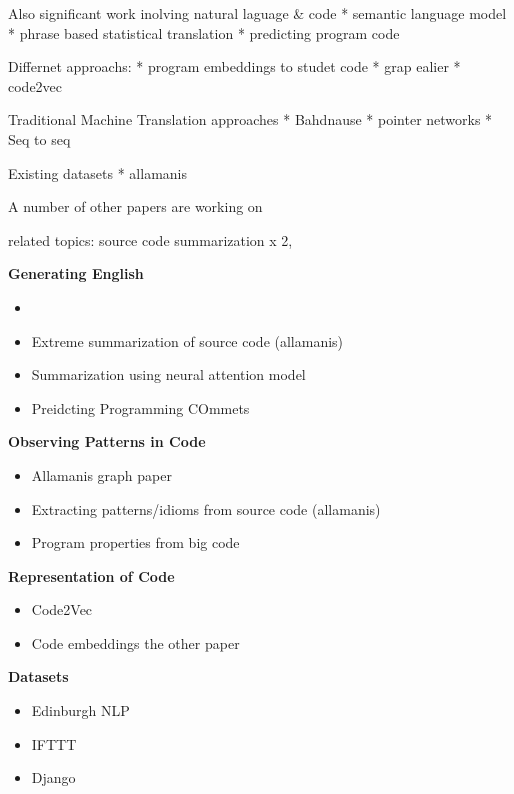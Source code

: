 Also significant work inolving natural laguage \& code
* semantic language model
* phrase based statistical translation
* predicting program code

Differnet approachs:
* program embeddings to studet code
* grap ealier
* code2vec

Traditional Machine Translation approaches
* Bahdnause
* pointer networks
* Seq to seq

Existing datasets
* allamanis


A number of other papers are working on 


related topics: source code summarization x 2, 

\textbf{Generating English}
\begin{itemize}
    \item 
    \item Extreme summarization of source code (allamanis)
    \item Summarization using neural attention model
    \item Preidcting Programming COmmets
\end{itemize}

\textbf{Observing Patterns in Code}
\begin{itemize}
    \item Allamanis graph paper
    \item Extracting patterns/idioms from source code (allamanis)
    \item Program properties from big code
\end{itemize}

\textbf{Representation of Code}
\begin{itemize}
    \item Code2Vec
    \item Code embeddings the other paper
\end{itemize}

\textbf{Datasets}
\begin{itemize}
    \item Edinburgh NLP
    \item IFTTT
    \item Django 
\end{itemize}




